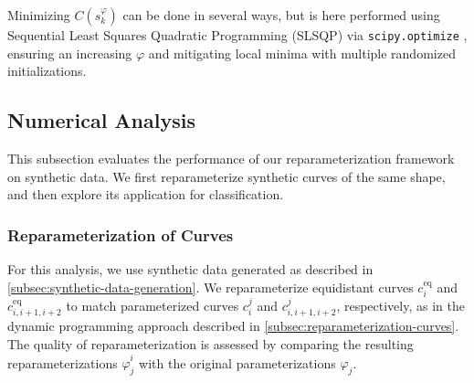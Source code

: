 Minimizing \(C(s_k^\varphi)\) can be done in several ways, but is here performed using Sequential Least Squares Quadratic Programming (SLSQP) via \texttt{scipy.optimize} \cite{virtanenSciPyFundamentalAlgorithms2020}, ensuring an increasing \(\varphi\) and mitigating local minima with multiple randomized initializations.

\subsection{Numerical Analysis}
\label{subsec:geodesic-interpolation-analysis}

This subsection evaluates the performance of our reparameterization framework on synthetic data. We first reparameterize synthetic curves of the same shape, and then explore its application for classification.

\subsubsection{Reparameterization of Curves}
\label{subsubsec:reparameterization-curves}

For this analysis, we use synthetic data generated as described in \ref{subsec:synthetic-data-generation}. We reparameterize equidistant curves \(c_i^\text{eq}\) and \(c_{i,i+1,i+2}^\text{eq}\) to match parameterized curves \(c_i^j\) and \(c_{i,i+1,i+2}^j\), respectively, as in the dynamic programming approach described in \ref{subsec:reparameterization-curves}. The quality of reparameterization is assessed by comparing the resulting reparameterizations \(\hat{\varphi}_j^i\) with the original parameterizations \(\varphi_j\). 


